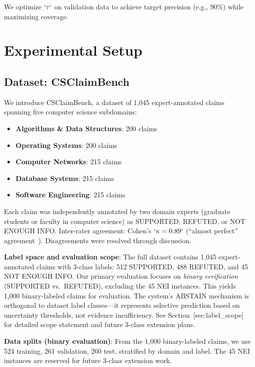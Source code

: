 We optimize \(`\tau`\) on validation data to achieve target precision (e.g., 90\%) while maximizing coverage.

\section{Experimental Setup}\label{experimental-setup}

\subsection{Dataset: CSClaimBench}\label{dataset-csclaimbench}

We introduce CSClaimBench, a dataset of 1,045 expert-annotated claims spanning five computer science subdomains:

\begin{itemize}
\item
  \textbf{Algorithms \& Data Structures}: 200 claims
\item
  \textbf{Operating Systems}: 200 claims
\item
  \textbf{Computer Networks}: 215 claims
\item
  \textbf{Database Systems}: 215 claims
\item
  \textbf{Software Engineering}: 215 claims
\end{itemize}

Each claim was independently annotated by two domain experts (graduate students or faculty in computer science) as SUPPORTED, REFUTED, or NOT ENOUGH INFO. Inter-rater agreement: Cohen's \(`\kappa = 0.89`\) (``almost perfect'' agreement~). Disagreements were resolved through discussion.

\textbf{Label space and evaluation scope}: The full dataset contains 1,045 expert-annotated claims with 3-class labels: 512 SUPPORTED, 488 REFUTED, and 45 NOT ENOUGH INFO. Our primary evaluation focuses on \emph{binary verification} (SUPPORTED vs.~REFUTED), excluding the 45 NEI instances. This yields 1,000 binary-labeled claims for evaluation. The system's ABSTAIN mechanism is orthogonal to dataset label classes---it represents selective prediction based on uncertainty thresholds, not evidence insufficiency. See Section~{[}sec:label\_scope{]} for detailed scope statement and future 3-class extension plans.

\textbf{Data splits (binary evaluation)}: From the 1,000 binary-labeled claims, we use 524 training, 261 validation, 260 test, stratified by domain and label. The 45 NEI instances are reserved for future 3-class extension work.

